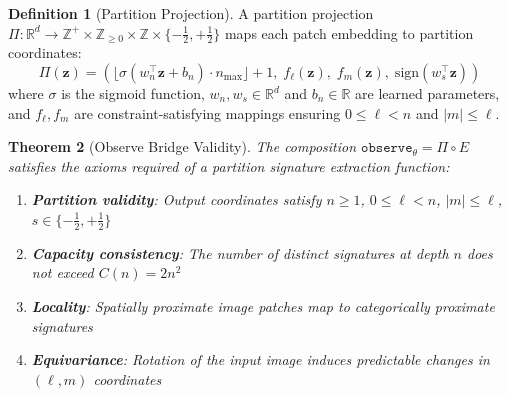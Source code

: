 \documentclass[11pt,twocolumn,a4paper]{article}
\newtheorem{theorem}{Theorem}[section]
\theoremstyle{definition}
\newtheorem{definition}[theorem]{Definition}
\theoremstyle{remark}
\newcommand{\R}{\mathbb{R}}
\newcommand{\Z}{\mathbb{Z}}
\begin{document}
\begin{definition}[Partition Projection]
\label{def:projection}
A partition projection $\Pi: \R^d \to \Z^+ \times \Z_{\geq 0} \times \Z \times \{-\frac{1}{2}, +\frac{1}{2}\}$ maps each patch embedding to partition coordinates:
\begin{equation}
\Pi(\mathbf{z}) = \left(\lfloor \sigma(w_n^\top \mathbf{z} + b_n) \cdot n_{\max} \rfloor + 1, \; f_\ell(\mathbf{z}), \; f_m(\mathbf{z}), \; \text{sign}(w_s^\top \mathbf{z})\right)
\end{equation}
where $\sigma$ is the sigmoid function, $w_n, w_s \in \R^d$ and $b_n \in \R$ are learned parameters, and $f_\ell, f_m$ are constraint-satisfying mappings ensuring $0 \leq \ell < n$ and $|m| \leq \ell$.
\end{definition}

\begin{theorem}[Observe Bridge Validity]
\label{thm:observe}
The composition $\texttt{observe}_\theta = \Pi \circ E$ satisfies the axioms required of a partition signature extraction function:
\begin{enumerate}
    \item \textbf{Partition validity}: Output coordinates satisfy $n \geq 1$, $0 \leq \ell < n$, $|m| \leq \ell$, $s \in \{-\frac{1}{2}, +\frac{1}{2}\}$
    \item \textbf{Capacity consistency}: The number of distinct signatures at depth $n$ does not exceed $C(n) = 2n^2$
    \item \textbf{Locality}: Spatially proximate image patches map to categorically proximate signatures
    \item \textbf{Equivariance}: Rotation of the input image induces predictable changes in $(\ell, m)$ coordinates
\end{enumerate}
\end{theorem}
\end{document}
